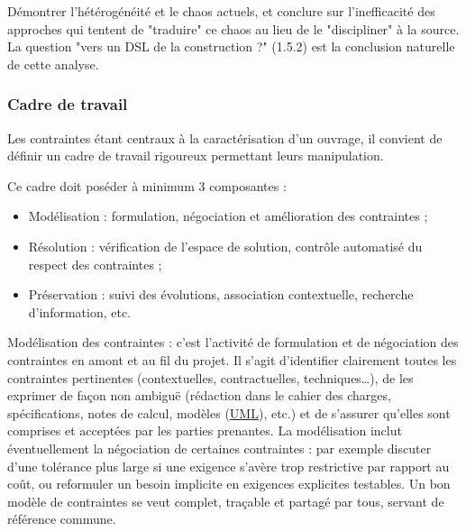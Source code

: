 \documentclass[a4paper,12pt]{article}
\begin{document}
Démontrer l'hétérogénéité et le chaos actuels, et conclure sur l'inefficacité des approches qui tentent de "traduire" ce chaos au lieu de le "discipliner" à la source.
La question "vers un DSL de la construction ?" (1.5.2) est la conclusion naturelle de cette analyse.
\subsubsection{Cadre de travail}
\label{sec:orgf54aad6}
Les contraintes étant centraux à la caractérisation d'un ouvrage, il convient de définir un cadre de travail rigoureux permettant leurs manipulation.

Ce cadre doit poséder à minimum 3 composantes :
\begin{itemize}
\item Modélisation : formulation, négociation et amélioration des contraintes ;
\item Résolution : vérification de l'espace de solution, contrôle automatisé du respect des contraintes ;
\item Préservation : suivi des évolutions, association contextuelle, recherche d'information, etc.
\end{itemize}

Modélisation des contraintes : c’est l’activité de formulation et de négociation des contraintes en amont et au fil du projet. Il s’agit d’identifier clairement toutes les contraintes pertinentes (contextuelles, contractuelles, techniques…), de les exprimer de façon non ambiguë (rédaction dans le cahier des charges, spécifications, notes de calcul, modèles  (\protect\hyperlink{gls-3}{\label{gls-3-use-1}UML}), etc.) et de s’assurer qu’elles sont comprises et acceptées par les parties prenantes. La modélisation inclut éventuellement la négociation de certaines contraintes : par exemple discuter d’une tolérance plus large si une exigence s’avère trop restrictive par rapport au coût, ou reformuler un besoin implicite en exigences explicites testables. Un bon modèle de contraintes se veut complet, traçable et partagé par tous, servant de référence commune.
\end{document}
